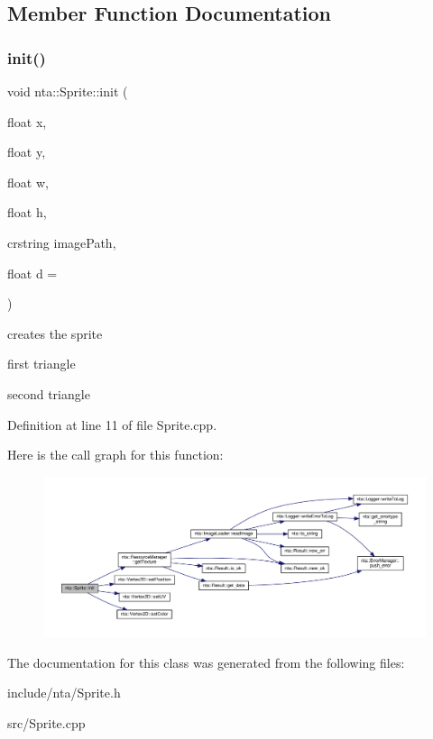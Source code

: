 \subsection{Member Function Documentation}
\mbox{\label{classnta_1_1Sprite_a1054dba693836caca9e755acc530d2fd}} 
\subsubsection{\texorpdfstring{init()}{init()}}
{\footnotesize\ttfamily void nta\+::\+Sprite\+::init (\begin{DoxyParamCaption}\item[{float}]{x,  }\item[{float}]{y,  }\item[{float}]{w,  }\item[{float}]{h,  }\item[{crstring}]{image\+Path,  }\item[{float}]{d = {} }\end{DoxyParamCaption})}



creates the sprite 

first triangle

second triangle 

Definition at line 11 of file Sprite.\+cpp.

Here is the call graph for this function\+:\nopagebreak
\begin{figure}[H]
\begin{center}
\leavevmode
\includegraphics[width=350pt]{d4/d60/classnta_1_1Sprite_a1054dba693836caca9e755acc530d2fd_cgraph}
\end{center}
\end{figure}


The documentation for this class was generated from the following files\+:\begin{DoxyCompactItemize}
\item 
include/nta/Sprite.\+h\item 
src/Sprite.\+cpp\end{DoxyCompactItemize}
